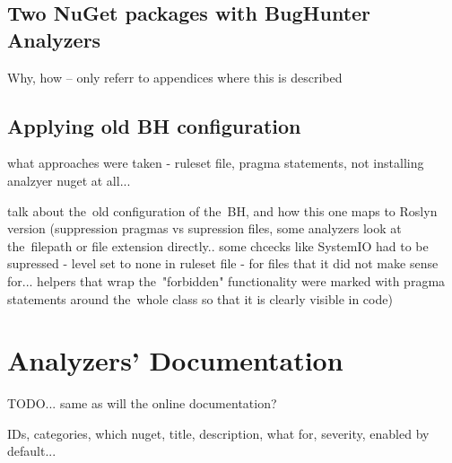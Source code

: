 \documentclass[
  digital, %
  table,   %
  lof,     %
  lot,     %
  oneside,
]{fithesis3}
\begin{document}
\section{Two NuGet packages with BugHunter Analyzers}
Why, how -- only referr to appendices where this is described

\section{Applying old BH configuration}
what approaches were taken - ruleset file, pragma statements, not installing analzyer nuget at all...

talk about the~old configuration of the~BH, and how this one maps to Roslyn version (suppression pragmas vs supression files, some analyzers look at the~filepath or file extension directly.. some chcecks like SystemIO had to be supressed - level set to none in ruleset file - for files that it did not make sense for... helpers that wrap the~"forbidden" functionality were marked with pragma statements around the~whole class so that it is clearly visible in code)

\chapter{Analyzers' Documentation}
TODO...
same as will the online documentation?

IDs, categories, which nuget, title, description, what for, severity, enabled by default...
\end{document}
